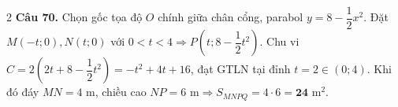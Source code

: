 \documentclass[12pt,a4paper]{article}
\begin{document}
\begin{multicols}{2}
\textbf{Câu 70.} Chọn gốc tọa độ $O$ chính giữa chân cổng, parabol $y = 8 - \dfrac{1}{2}x^2$. Đặt $M(-t; 0), N(t; 0)$ với $0 < t < 4 \Rightarrow P\left(t; 8 - \dfrac{1}{2}t^2\right)$. Chu vi $C = 2\left(2t + 8 - \dfrac{1}{2}t^2\right) = -t^2 + 4t + 16$, đạt GTLN tại đỉnh $t = 2 \in (0; 4)$. Khi đó đáy $MN = 4\text{ m}$, chiều cao $NP = 6\text{ m} \Rightarrow S_{MNPQ} = 4 \cdot 6 = \mathbf{24}\text{ m}^2$.\par\vspace{3pt}

\end{multicols}
\end{document}

